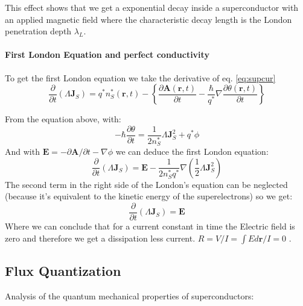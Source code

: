 \documentclass[12pt]{article}
\numberwithin{equation}{subsection}
\newcommand\ask[1]{
{%
}
}
\newcommand\page[1]{
{
}
}
\begin{document}
This effect shows that we get a exponential decay inside a superconductor with an applied magnetic field where the characteristic decay length is the London penetration depth $\lambda_L$.

\paragraph{First London Equation and perfect conductivity\\}
To get the first London equation we take the derivative of eq. \ref{eq:supcur}
\begin{equation}
    \frac{\partial}{\partial t}  (\Lambda \mathbf J_S) = q^* n_S^*(\mathbf r,t) -\left \{\frac{\partial \mathbf A (\mathbf r, t)}{\partial t} -\frac{\hbar}{q^*} \nabla\frac{\partial \theta(\mathbf r, t)}{\partial t}   \right \}
    \label{eq:supcur}
\end{equation}

From the equation above, with:
\begin{equation}
    -\hbar \frac{\partial \theta}{\partial t}  = \frac{1}{2n^*_S} \Lambda \mathbf J^2_S + q^*\phi
    \label{eq:energy_phase}
\end{equation}
And with $ \mathbf E = - \partial \mathbf A /\partial t - \nabla \phi$ we can deduce the first London equation:
\begin{equation}
     \frac{\partial}{\partial t}  (\Lambda \mathbf J_S) = \mathbf E - \frac{1}{2n^*_Sq^*} \nabla (\frac{1}{2}\Lambda \mathbf J_S^2)
\label{eq:fstld}
\end{equation}
The second term in the right side of the London's equation can be neglected (because it's equivalent to the kinetic energy of the superelectrons) so we get:
\begin{equation}
     \frac{\partial}{\partial t}  (\Lambda \mathbf J_S) = \mathbf E 
\label{eq:fstldneglected}
\end{equation}
Where we can conclude that for a current constant in time the Electric field is zero and therefore we get a dissipation less current. $R=V/I=\int E d\mathbf r/I =0$ .

\page{19 e 20}
\subsection{Flux Quantization}
\page{24}
Analysis of the quantum mechanical properties of superconductors:
\end{document}
